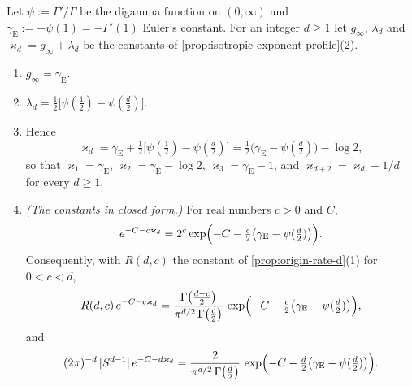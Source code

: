 \begin{lemma}
\label{lem:exponent-profile-constant}
Let $\psi := \Gamma'/\Gamma$ be the digamma function on $(0,\infty)$ and
$\gamma_{\mathrm E} := -\psi(1) = -\Gamma'(1)$ Euler's constant. For an integer $d \ge 1$ let
$g_\infty$, $\lambda_d$ and $\varkappa_d = g_\infty + \lambda_d$ be the constants of
\ref{prop:isotropic-exponent-profile}(2).
\begin{enumerate}
\item $g_\infty = \gamma_{\mathrm E}$.
\item $\lambda_d = \tfrac12\bigl[\psi(\tfrac12) - \psi(\tfrac d2)\bigr]$.
\item Hence
\[
  \varkappa_d = \gamma_{\mathrm E} + \tfrac12\bigl[\psi(\tfrac12) - \psi(\tfrac d2)\bigr]
   = \tfrac12\bigl(\gamma_{\mathrm E} - \psi(\tfrac d2)\bigr) - \log 2 ,
\]
so that $\varkappa_1 = \gamma_{\mathrm E}$, $\varkappa_2 = \gamma_{\mathrm E} - \log 2$,
$\varkappa_3 = \gamma_{\mathrm E} - 1$, and $\varkappa_{d+2} = \varkappa_d - 1/d$ for every
$d \ge 1$.
\item \emph{(The constants in closed form.)} For real numbers $c > 0$ and $C$,
\[
  e^{-C - c\varkappa_d}
   = 2^{c}\exp\Bigl(-C - \tfrac c2\bigl(\gamma_{\mathrm E} - \psi(\tfrac d2)\bigr)\Bigr) .
\]
Consequently, with $R(d,c)$ the constant of \ref{prop:origin-rate-d}(1) for $0 < c < d$,
\[
  R(d,c)\,e^{-C - c\varkappa_d}
   = \frac{\Gamma\bigl(\tfrac{d-c}{2}\bigr)}{\pi^{d/2}\,\Gamma\bigl(\tfrac c2\bigr)}\,
     \exp\Bigl(-C - \tfrac c2\bigl(\gamma_{\mathrm E} - \psi(\tfrac d2)\bigr)\Bigr),
\]
and
\[
  (2\pi)^{-d}\,|S^{d-1}|\,e^{-C - d\varkappa_d}
   = \frac{2}{\pi^{d/2}\,\Gamma\bigl(\tfrac d2\bigr)}\,
     \exp\Bigl(-C - \tfrac d2\bigl(\gamma_{\mathrm E} - \psi(\tfrac d2)\bigr)\Bigr) .
\]
\end{enumerate}

\end{lemma}
